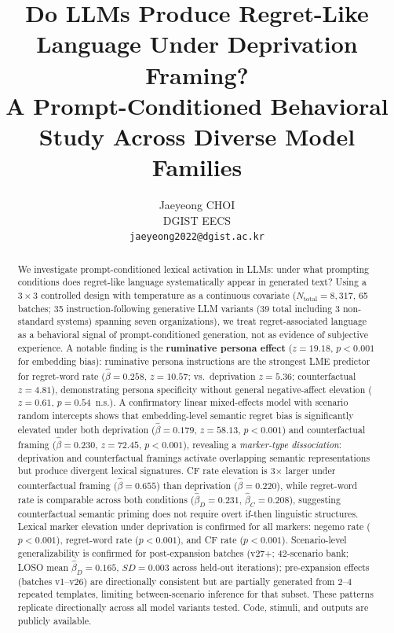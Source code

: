 \documentclass[conference,10pt]{IEEEtran}
\title{Do LLMs Produce Regret-Like Language Under Deprivation Framing?\\ A Prompt-Conditioned Behavioral Study Across Diverse Model Families}
\author{Jaeyeong CHOI\\
DGIST EECS\\
\texttt{jaeyeong2022@dgist.ac.kr}}
\begin{document}
\maketitle

\begin{abstract}
We investigate prompt-conditioned lexical activation in LLMs: under what prompting conditions does regret-like language systematically appear in generated text?
Using a $3 \times 3$ controlled design with temperature as a continuous covariate ($N_\text{total}=8{,}317$, 65 batches; 35 instruction-following generative LLM variants (39 total including 3 non-standard systems) spanning seven organizations), we treat regret-associated language as a behavioral signal of prompt-conditioned generation, not as evidence of subjective experience.
A notable finding is the \textbf{ruminative persona effect} ($z=19.18$, $p<0.001$ for embedding bias): ruminative persona instructions are the strongest LME predictor for regret-word rate ($\hat{\beta}=0.258$, $z=10.57$; vs.\ deprivation $z=5.36$; counterfactual $z=4.81$), demonstrating persona specificity without general negative-affect elevation ($z=0.61$, $p=0.54$~n.s.).
A confirmatory linear mixed-effects model with scenario random intercepts shows that embedding-level semantic regret bias is significantly elevated under both deprivation ($\hat{\beta}=0.179$, $z=58.13$, $p<0.001$) and counterfactual framing ($\hat{\beta}=0.230$, $z=72.45$, $p<0.001$), revealing a \emph{marker-type dissociation}: deprivation and counterfactual framings activate overlapping semantic representations but produce divergent lexical signatures. CF rate elevation is 3$\times$ larger under counterfactual framing ($\hat{\beta}=0.655$) than deprivation ($\hat{\beta}=0.220$), while regret-word rate is comparable across both conditions ($\hat{\beta}_D=0.231$, $\hat{\beta}_C=0.208$), suggesting counterfactual semantic priming does not require overt if-then linguistic structures.
Lexical marker elevation under deprivation is confirmed for all markers: negemo rate ($p<0.001$), regret-word rate ($p<0.001$), and CF rate ($p<0.001$).
Scenario-level generalizability is confirmed for post-expansion batches (v27+; 42-scenario bank; LOSO mean $\hat{\beta}_D=0.165$, $SD=0.003$ across held-out iterations); pre-expansion effects (batches v1--v26) are directionally consistent but are partially generated from 2--4 repeated templates, limiting between-scenario inference for that subset.
These patterns replicate directionally across all model variants tested.
Code, stimuli, and outputs are publicly available.
\end{abstract}
\end{document}

